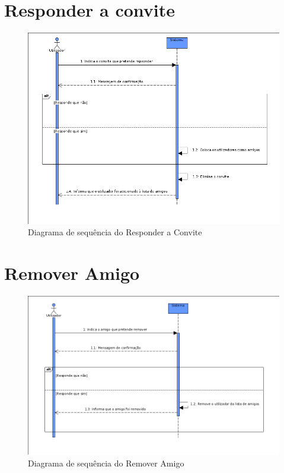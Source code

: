 \documentclass[a4paper]{report}
\begin{document}
\section{Responder a convite}
\begin{figure}[H]
	\centering 
    \includegraphics[width=\textwidth]{images/respconviteSeq.png}  
    \caption{Diagrama de sequência do Responder a Convite}
\end{figure}

\section{Remover Amigo}
\begin{figure}[H]
	\centering 
    \includegraphics[width=\textwidth]{images/remamigoSeq.png}  
    \caption{Diagrama de sequência do Remover Amigo}
\end{figure}
\end{document}
